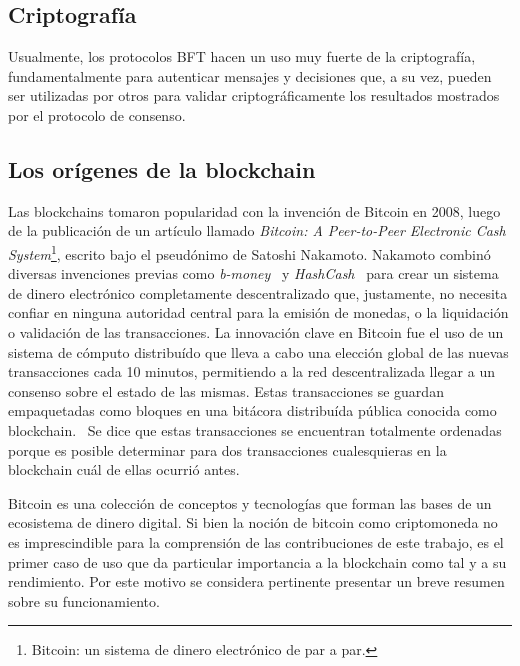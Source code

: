 \subsection{Criptografía}
Usualmente, los protocolos BFT hacen un uso muy fuerte de la criptografía, fundamentalmente para autenticar
mensajes y decisiones que, a su vez, pueden ser utilizadas por otros para validar criptográficamente los resultados
mostrados por el protocolo de consenso.

\subsection{Los orígenes de la blockchain}
Las blockchains tomaron popularidad con la invención de Bitcoin en 2008, luego de la publicación
de un artículo llamado \textit{Bitcoin: A Peer-to-Peer
Electronic Cash System}\footnote{Bitcoin: un sistema de dinero electrónico de par a par.}, escrito
bajo el pseudónimo de Satoshi Nakamoto.
Nakamoto combinó diversas invenciones previas como
\textit{b-money}~\cite{b.money} y \textit{HashCash}~\cite{hashcash} para crear un sistema de dinero electrónico completamente
descentralizado que, justamente, no necesita confiar en ninguna autoridad central para la emisión de monedas,
o la liquidación o validación de las transacciones. 
La innovación clave en Bitcoin fue el uso de un sistema de cómputo distribuído que lleva
a cabo una elección global de las nuevas transacciones cada 10 minutos, permitiendo
a la red descentralizada llegar a un consenso sobre el estado de las mismas. Estas transacciones
se guardan empaquetadas como bloques en una bitácora distribuída pública conocida como blockchain.~\cite{mastering.bitcoin}
%
Se dice que estas transacciones se encuentran totalmente ordenadas porque es posible determinar para
dos transacciones cualesquieras en la blockchain cuál de ellas ocurrió antes.


Bitcoin es una colección de conceptos y tecnologías que forman las bases de un ecosistema de dinero
digital.
%
Si bien la noción de bitcoin como criptomoneda no es imprescindible para la comprensión de las
contribuciones de este trabajo, es el primer caso de uso que da particular importancia a la blockchain
como tal y a su rendimiento. Por este motivo se considera pertinente presentar un breve resumen sobre
su funcionamiento.

